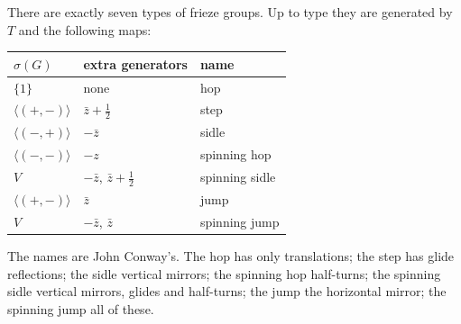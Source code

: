 \begin{theorem}\label{thm:friezes}
There are exactly seven types of frieze groups. Up to type they are generated by $T$ and the following maps:
\begin{center}
\begin{tabular}{@{}lll@{}}
\hline
$\sigma(G)$ & extra generators & name\\
\hline
$\{1\}$ & none & hop\\
$\langle(+,-)\rangle$ & $\bar z+\frac12$ & step\\
$\langle(-,+)\rangle$ & $-\bar z$ & sidle\\
$\langle(-,-)\rangle$ & $-z$ & spinning hop\\
$V$ & $-\bar z$, $\bar z+\frac12$ & spinning sidle\\
$\langle(+,-)\rangle$ & $\bar z$ & jump\\
$V$ & $-\bar z$, $\bar z$ & spinning jump\\
\hline
\end{tabular}
\end{center}
The names are John Conway's. The hop has only translations; the step has glide reflections; the sidle vertical mirrors; the spinning
hop half-turns; the spinning sidle vertical mirrors, glides and half-turns; the jump the horizontal mirror; the spinning jump all of
these.
\end{theorem}
